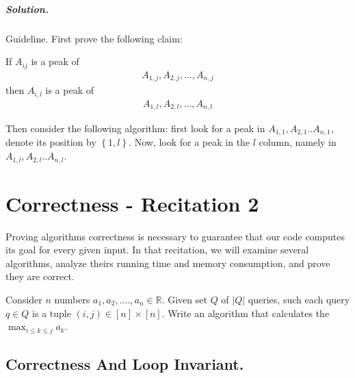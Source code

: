   \paragraph{Solution.} Guideline. First prove the following claim:  

  \begin{claim}
If $A_{ij}$ is a peak of 
\begin{equation*}
  \begin{split}
    A_{1,j}, A_{2,j}, \dots, A_{n,j}
  \end{split}
\end{equation*}
then $A_{i,l}$ is a peak of 
\begin{equation*}
  \begin{split}
    A_{1,l}, A_{2,l}, \dots, A_{n,l}
  \end{split}
\end{equation*}
  \end{claim}

Then consider the following algorithm: first look for a peak in $A_{1,1},A_{2,1}..A_{n,1}$, denote its position by $\left\{ 1,l \right\}$. Now, look for a peak in the $l$ column, namely in $A_{1,l},A_{2,l}..A_{n,l}$.
\fi 
\fi




    
\chapter{Correctness - Recitation 2} 
    Proving algorithms correctness is necessary to guarantee that our code computes its goal for every given input. In that recitation, we will examine several algorithms, analyze theirs running time and memory consumption, and prove they are correct.   


\begin{example}
Consider \(n\) numbers \(a_1,a_2,....,a_n \in \mathbb{R}\). Given set \(Q\) of \(|Q|\) queries, such each query \(q \in Q\) is a tuple \( (i,j) \in [n] \times [n] \). Write an algorithm that calculates the \(\max_{i\le k\le j}{a_k} \). 
\end{example}
\section{Correctness And Loop Invariant.}

